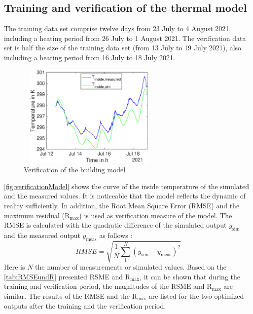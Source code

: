     \subsection{Training and verification of the thermal model}
    \label{verificationthermalmodel}
    The training data set comprise twelve days from 23 July to 4 August 2021, including a heating period from 26 July to 1 August 2021. The verification data set is half the size of the training data set (from 13 July to 19 July 2021), also including a heating period from 16 July to 18 July 2021. \newline
    \begin{figure}
            \centering
            \includegraphics[width=7cm,height=5cm]{figure/Verlauf_inside_ValidierungModell.eps}
           \caption{Verification of the building model}
           \label{fig:verificationModel}
    \end{figure}
   \autoref{fig:verificationModel} shows the curve of the inside temperature of the simulated and the measured values. It is noticeable that the model reflects the dynamic of reality sufficiently. In addition, the Root Mean Square Error (RMSE)  and the maximum residual ($\mathrm{R}_\text{max}$) is used as verification measure of the model.\newline
    The RMSE is calculated with the quadratic difference of the simulated output $y_\text{sim}$ and the measured output $y_\text {meas}$ as follows \cite{Barnston.1992}: 
    \begin{equation}
        RMSE = \sqrt{\frac{1}{N} \sum \limits_1^N (y_\text{sim} - y_\text {meas})^2}
    \end{equation}
    Here is $N$ the number of measurements or simulated values.
    Based on the \autoref{tab:RMSEundR} presented RSME and $\mathrm{R}_\text{max}$, it can be shown that during the training and verification period, the magnitudes of the RSME and $\mathrm{R}_\text{max}$ are similar. The results of the RMSE and the $\mathrm{R}_\text{max}$ are listed for the two optimized outputs after the training and the verification period.
